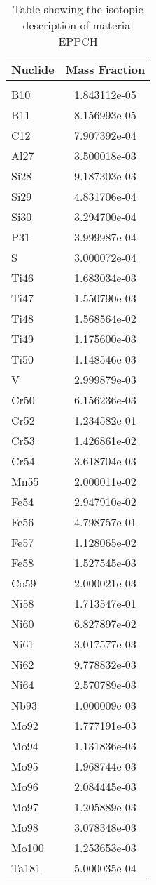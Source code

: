\begin{centering}
\begin{table}[ht!]
\begin{tabular}{l | c}
\hline
Nuclide & Mass Fraction\\
\hline
\\
B10 & 1.843112e-05\\
B11 & 8.156993e-05\\
C12 & 7.907392e-04\\
Al27 & 3.500018e-03\\
Si28 & 9.187303e-03\\
Si29 & 4.831706e-04\\
Si30 & 3.294700e-04\\
P31 & 3.999987e-04\\
S & 3.000072e-04\\
Ti46 & 1.683034e-03\\
Ti47 & 1.550790e-03\\
Ti48 & 1.568564e-02\\
Ti49 & 1.175600e-03\\
Ti50 & 1.148546e-03\\
V & 2.999879e-03\\
Cr50 & 6.156236e-03\\
Cr52 & 1.234582e-01\\
Cr53 & 1.426861e-02\\
Cr54 & 3.618704e-03\\
Mn55 & 2.000011e-02\\
Fe54 & 2.947910e-02\\
Fe56 & 4.798757e-01\\
Fe57 & 1.128065e-02\\
Fe58 & 1.527545e-03\\
Co59 & 2.000021e-03\\
Ni58 & 1.713547e-01\\
Ni60 & 6.827897e-02\\
Ni61 & 3.017577e-03\\
Ni62 & 9.778832e-03\\
Ni64 & 2.570789e-03\\
Nb93 & 1.000009e-03\\
Mo92 & 1.777191e-03\\
Mo94 & 1.131836e-03\\
Mo95 & 1.968744e-03\\
Mo96 & 2.084445e-03\\
Mo97 & 1.205889e-03\\
Mo98 & 3.078348e-03\\
Mo100 & 1.253653e-03\\
Ta181 & 5.000035e-04
\end{tabular}
\caption{Table showing the isotopic description of material EPPCH}
\label{table:material_EPPCH}
\end{table}\clearpage


\end{centering}
